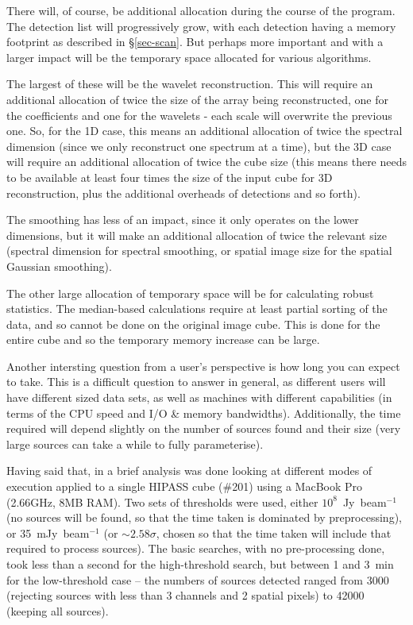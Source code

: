 There will, of course, be additional allocation during the course of
the program. The detection list will progressively grow, with each
detection having a memory footprint as described in
\S\ref{sec-scan}. But perhaps more important and with a larger
impact will be the temporary space allocated for various algorithms.

The largest of these will be the wavelet reconstruction. This will
require an additional allocation of twice the size of the array being
reconstructed, one for the coefficients and one for the wavelets -
each scale will overwrite the previous one. So, for the 1D case, this
means an additional allocation of twice the spectral dimension (since
we only reconstruct one spectrum at a time), but the 3D case will
require an additional allocation of twice the cube size (this means
there needs to be available at least four times the size of the input
cube for 3D reconstruction, plus the additional overheads of
detections and so forth).

The smoothing has less of an impact, since it only operates on the
lower dimensions, but it will make an additional allocation of twice
the relevant size (spectral dimension for spectral smoothing, or
spatial image size for the spatial Gaussian smoothing).

The other large allocation of temporary space will be for calculating
robust statistics. The median-based calculations require at least
partial sorting of the data, and so cannot be done on the original
image cube. This is done for the entire cube and so the temporary
memory increase can be large.



Another intersting question from a user's perspective is how long you
can expect \duchamp to take. This is a difficult question to answer in
general, as different users will have different sized data sets, as
well as machines with different capabilities (in terms of the CPU
speed and I/O \& memory bandwidths). Additionally, the time required
will depend slightly on the number of sources found and their size
(very large sources can take a while to fully parameterise). 

Having said that, in \citet{whiting12} a brief analysis was done
looking at different modes of execution applied to a single HIPASS
cube (\#201) using a MacBook Pro (2.66GHz, 8MB RAM). Two sets of
thresholds were used, either $10^8$~Jy~beam$^{-1}$ (no sources will be
found, so that the time taken is dominated by preprocessing), or
35~mJy~beam$^{-1}$ (or $\sim2.58\sigma$, chosen so that the time taken
will include that required to process sources).  The basic searches,
with no pre-processing done, took less than a second for the
high-threshold search, but between 1 and 3~min for the low-threshold
case -- the numbers of sources detected ranged from 3000 (rejecting
sources with less than 3 channels and 2 spatial pixels) to 42000
(keeping all sources).

